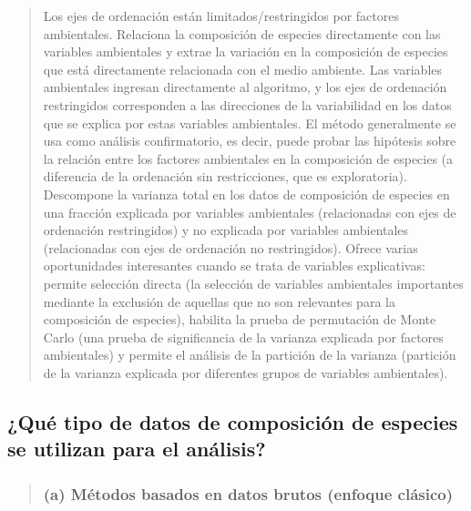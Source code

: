 \documentclass[
]{book}
\begin{document}
\begin{quote}
Los ejes de ordenación están limitados/restringidos por factores ambientales. Relaciona la composición de especies directamente con las variables ambientales y extrae la variación en la composición de especies que está directamente relacionada con el medio ambiente. Las variables ambientales ingresan directamente al algoritmo, y los ejes de ordenación restringidos corresponden a las direcciones de la variabilidad en los datos que se explica por estas variables ambientales. El método generalmente se usa como análisis confirmatorio, es decir, puede probar las hipótesis sobre la relación entre los factores ambientales en la composición de especies (a diferencia de la ordenación sin restricciones, que es exploratoria). Descompone la varianza total en los datos de composición de especies en una fracción explicada por variables ambientales (relacionadas con ejes de ordenación restringidos) y no explicada por variables ambientales (relacionadas con ejes de ordenación no restringidos). Ofrece varias oportunidades interesantes cuando se trata de variables explicativas: permite selección directa (la selección de variables ambientales importantes mediante la exclusión de aquellas que no son relevantes para la composición de especies), habilita la prueba de permutación de Monte Carlo (una prueba de significancia de la varianza explicada por factores ambientales) y permite el análisis de la partición de la varianza (partición de la varianza explicada por diferentes grupos de variables ambientales).
\end{quote}

\hypertarget{quuxe9-tipo-de-datos-de-composiciuxf3n-de-especies-se-utilizan-para-el-anuxe1lisis}{%
\subsection{¿Qué tipo de datos de composición de especies se utilizan para el análisis?}\label{quuxe9-tipo-de-datos-de-composiciuxf3n-de-especies-se-utilizan-para-el-anuxe1lisis}}

\begin{quote}
\hypertarget{a-muxe9todos-basados-en-datos-brutos-enfoque-cluxe1sico}{%
\subsubsection{(a) Métodos basados en datos brutos (enfoque clásico)}\label{a-muxe9todos-basados-en-datos-brutos-enfoque-cluxe1sico}}
\end{quote}
\end{document}
